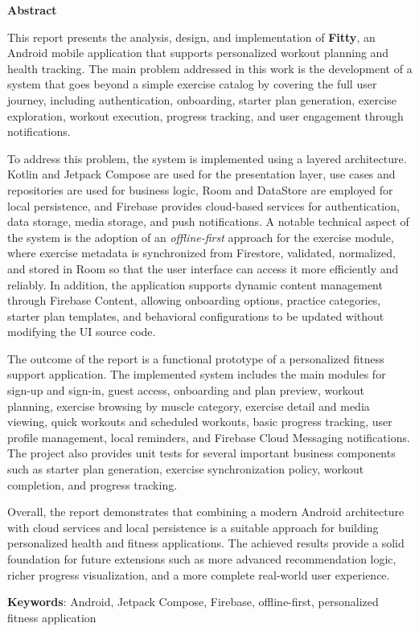 \begin{center}
\textbf{\large{Abstract}}
\end{center}

\begin{small}

This report presents the analysis, design, and implementation of \textbf{Fitty}, an Android mobile application that supports personalized workout planning and health tracking. The main problem addressed in this work is the development of a system that goes beyond a simple exercise catalog by covering the full user journey, including authentication, onboarding, starter plan generation, exercise exploration, workout execution, progress tracking, and user engagement through notifications.

To address this problem, the system is implemented using a layered architecture. Kotlin and Jetpack Compose are used for the presentation layer, use cases and repositories are used for business logic, Room and DataStore are employed for local persistence, and Firebase provides cloud-based services for authentication, data storage, media storage, and push notifications. A notable technical aspect of the system is the adoption of an \textit{offline-first} approach for the exercise module, where exercise metadata is synchronized from Firestore, validated, normalized, and stored in Room so that the user interface can access it more efficiently and reliably. In addition, the application supports dynamic content management through Firebase Content, allowing onboarding options, practice categories, starter plan templates, and behavioral configurations to be updated without modifying the UI source code.

The outcome of the report is a functional prototype of a personalized fitness support application. The implemented system includes the main modules for sign-up and sign-in, guest access, onboarding and plan preview, workout planning, exercise browsing by muscle category, exercise detail and media viewing, quick workouts and scheduled workouts, basic progress tracking, user profile management, local reminders, and Firebase Cloud Messaging notifications. The project also provides unit tests for several important business components such as starter plan generation, exercise synchronization policy, workout completion, and progress tracking.

Overall, the report demonstrates that combining a modern Android architecture with cloud services and local persistence is a suitable approach for building personalized health and fitness applications. The achieved results provide a solid foundation for future extensions such as more advanced recommendation logic, richer progress visualization, and a more complete real-world user experience.

\vspace*{1cm}
\textbf{Keywords}: Android, Jetpack Compose, Firebase, offline-first, personalized fitness application
\end{small}

